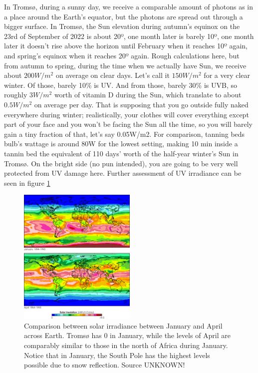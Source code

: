 In Tromsø, during a sunny day, we receive a comparable amount of photons as in a place around the Earth's equator, but the photons are spread out through a bigger surface. In Tromsø, the Sun elevation during autumn's equinox on the 23rd of September of 2022 is about 20º, one month later is barely 10º, one month later it doesn't rise above the horizon until February when it reaches 10º again, and spring's equinox when it reaches 20º again. Rough calculations here, but from autumn to spring, during the time when we actually have Sun, we receive about $200W/m^2$ on average on clear days. Let's call it $150W/m^2$ for a very clear winter. Of those, barely 10\% is UV. And from those, barely 30\% is UVB, so  roughly $3W/m^2$ worth of vitamin D during the Sun, which translate to about $0.5W/m^2$ on average per day. That is supposing that you go outside fully naked everywhere during winter; realistically, your clothes will cover everything except part of your face and you won't be facing the Sun all the time, so you will barely gain a tiny fraction of that, let's say 0.05W/m2. For comparison, tanning beds bulb's wattage is around 80W for the lowest setting, making 10 min inside a tannin bed the equivalent of 110 days' worth of the half-year winter's Sun in Tromsø. On the bright side (no pun intended), you are going to be very well protected from UV damage here. Further assessment of UV irradiance can be seen in figure \ref{fig:sunirradianceJA}

\begin{figure}[h!]

    \centering
    \includegraphics[width=0.5\textwidth]{figures/Vitamin D/512px-Insolation_gif.png}
    \caption{Comparison between solar irradiance between January and April across Earth. Tromsø has 0 in January, while the levels of April are comparably similar to those in the north of Africa during January. Notice that in January, the South Pole has the highest levels possible due to snow reflection. Source UNKNOWN!}
    \label{fig:sunirradianceJA}

\end{figure}
 
